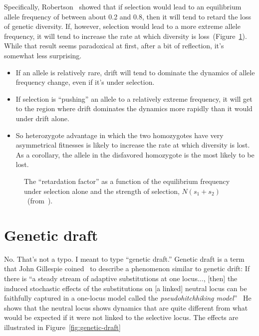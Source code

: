 Specifically, Robertson~\cite{Robertson-1962} showed that if selection
would lead to an equilibrium allele frequency of between about 0.2 and
0.8, then it will tend to retard the loss of genetic diversity. If,
however, selection would lead to a more extreme allele frequency, it
will tend to increase the rate at which diversity is
loss~(Figure~\ref{fig:drift-heterozygote-advantage}). While that
result seems paradoxical at first, after a bit of reflection, it's
somewhat less surprising.

\begin{itemize}

\item If an allele is relatively rare, drift will tend to dominate the
  dynamics of allele frequency change, even if it's under selection.

\item If selection is ``pushing'' an allele to a relatively extreme
  frequency, it will get to the region where drift dominates the
  dynamics more rapidly than it would under drift alone.

\item So heterozygote advantage in which the two homozygotes have very
  asymmetrical fitnesses is likely to increase the rate at which
  diversity is lost. As a corollary, the allele in the disfavored
  homozygote is the most likely to be lost.

\end{itemize}

\begin{figure}
\begin{center}
\end{center}
\caption{The ``retardation factor'' as a function of the equilibrium
  frequency under selection alone and the strength of selection,
  $N(s_1+s_2)$~(from~\cite{Robertson-1962}).}\label{fig:drift-heterozygote-advantage} 
\end{figure}

\section*{Genetic draft}

No. That's not a typo. I meant to type ``genetic draft.'' Genetic
draft is a term that John Gillespie coined~\cite{Gillespie-2000} to
describe a phenomenon similar to genetic drift: If there is ``a steady
stream of adaptive substitutions at one locus$\dots$, [then] the
induced stochastic effects of the substitutions on [a linked] neutral
locus can be faithfully captured in a one-locus model called the {\it
  pseudohitchhiking model}''~\cite[p. 909]{Gillespie-2000} He shows
that the neutral locus shows dynamics that are quite different from
what would be expected if it were not linked to the selective
locus. The effects are illustrated in Figure~\ref{fig:genetic-draft}

